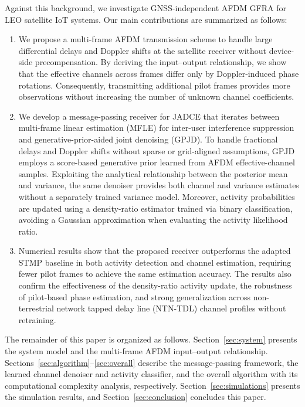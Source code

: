 Against this background, we investigate GNSS-independent AFDM GFRA for LEO
satellite IoT systems. Our main contributions are summarized as follows:

\begin{enumerate}[label=\arabic*)]

\item We propose a multi-frame AFDM transmission scheme to handle large differential
delays and Doppler shifts at the satellite receiver without device-side
precompensation. By deriving the input--output relationship, we show that the
effective channels across frames differ only by Doppler-induced phase
rotations. Consequently, transmitting additional pilot frames provides more
observations without increasing the number of unknown channel coefficients.

\item We develop a message-passing receiver for JADCE that iterates between
multi-frame linear estimation (MFLE) for inter-user interference suppression
and generative-prior-aided joint denoising (GPJD). To handle fractional delays
and Doppler shifts without sparse or grid-aligned assumptions, GPJD employs a
score-based generative prior learned from AFDM effective-channel samples.
Exploiting the analytical relationship between the posterior mean and
variance, the same denoiser provides both channel and variance estimates
without a separately trained variance model. Moreover, activity probabilities
are updated using a density-ratio estimator trained via binary classification,
avoiding a Gaussian approximation when evaluating the activity likelihood ratio.

\item Numerical results show that the proposed receiver outperforms the adapted STMP
baseline in both activity detection and channel estimation, requiring fewer
pilot frames to achieve the same estimation accuracy. The results also confirm
the effectiveness of the density-ratio activity update, the robustness of
pilot-based phase estimation, and strong generalization across non-terrestrial
network tapped delay line (NTN-TDL) channel profiles without retraining.

\end{enumerate}

The remainder of this paper is organized as follows. Section~\ref{sec:system}
presents the system model and the multi-frame AFDM input--output relationship.
Sections~\ref{sec:algorithm}--\ref{sec:overall} describe the message-passing
framework, the learned channel denoiser and activity classifier, and the
overall algorithm with its computational complexity analysis, respectively.
Section~\ref{sec:simulations} presents the simulation results, and
Section~\ref{sec:conclusion} concludes this paper.
